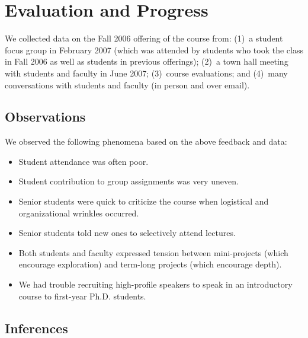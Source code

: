 \section{Evaluation and Progress}\label{sec:progress}

We collected data on the Fall 2006 offering of the course
from: (1)~a student focus group in February 2007 (which was attended by
students who took the class in Fall 2006 as well as students in previous
offerings); (2)~a town hall meeting with students and faculty in June
2007; (3)~course evaluations; and (4)~many conversations with students
and faculty (in person and over email).

\subsection{Observations}

We observed the following phenomena based on the above feedback and
data:
\begin{itemize}
\itemsep=-1pt
\item Student attendance was often poor.
\item Student contribution to group assignments was very uneven.
\item Senior students were quick to criticize the course when logistical
  and organizational wrinkles occurred.
\item Senior students told new ones to selectively attend lectures.
\item Both students and faculty expressed tension between mini-projects
  (which encourage exploration) and term-long projects (which encourage
  depth). 
\item We had trouble recruiting high-profile speakers to speak in an
  introductory course to first-year Ph.D. students.
\end{itemize}

\subsection{Inferences}

